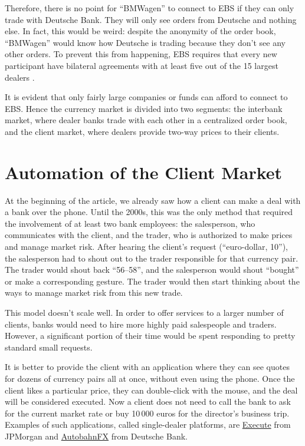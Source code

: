 \documentclass[a4paper,14pt]{extarticle}
\begin{document}
Therefore, there is no point for ``BMWagen'' to connect to EBS if they can only 
trade with Deutsche Bank. They will only see orders from Deutsche and nothing 
else. In fact, this would be weird: despite the anonymity of the order book, 
``BMWagen'' would know how Deutsche is trading because they don't see any other 
orders. To prevent this from happening, EBS requires that every new participant 
have bilateral agreements with at least five out of the 15 largest dealers 
\cite{cme2019elig}.

It is evident that only fairly large companies or funds can afford to connect to 
EBS. Hence the currency market is divided into two segments: the interbank 
market, where dealer banks trade with each other in a centralized order book, 
and the client market, where dealers provide two-way prices to their clients.

\section*{Automation of the Client Market}

At the beginning of the article, we already saw how a client can make a deal 
with a bank over the phone. Until the 2000s, this was the only method that 
required the involvement of at least two bank employees: the salesperson, who 
communicates with the client, and the trader, who is authorized to make prices 
and manage market risk. After hearing the client's request 
(``euro-dollar, 10''), the salesperson had to shout out to the trader 
responsible for that currency pair. The trader would shout back ``56--58'', and 
the salesperson would shout ``bought'' or make a corresponding gesture. The 
trader would then start thinking about the ways to manage market risk from this 
new trade.

This model doesn't scale well. In order to offer services to a larger number of 
clients, banks would need to hire more highly paid salespeople and traders. 
However, a significant portion of their time would be spent responding to pretty 
standard small requests.

It is better to provide the client with an application where they can see quotes 
for dozens of currency pairs all at once, without even using the phone. Once the 
client likes a particular price, they can double-click with the mouse, and the 
deal will be considered executed. Now a client does not need to call the bank to 
ask for the current market rate or buy 10\,000 euros for the director's business 
trip. Examples of such applications, called single-dealer platforms, are 
\href{https://www.jpmorgan.com/global/markets/execute}{Execute} from JPMorgan  
and \href{https://autobahn.db.com/microSite/html/fx.html}{AutobahnFX} from 
Deutsche Bank.
\end{document}
